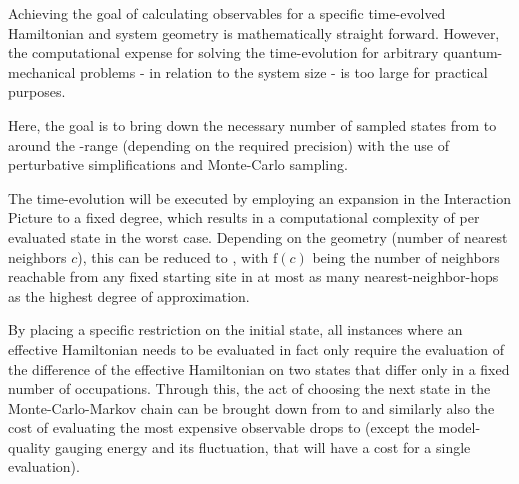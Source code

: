 Achieving the goal of calculating observables for a specific time-evolved Hamiltonian and system geometry is mathematically straight forward.
However, the computational expense for solving the time-evolution for arbitrary quantum-mechanical problems - in relation to the system size - is too large for practical purposes.

Here, the goal is to bring down the necessary number of sampled states from  to around the -range (depending on the required precision) with the use of perturbative simplifications and Monte-Carlo sampling. 

The time-evolution will be executed by employing an expansion in the Interaction Picture to a fixed degree, which results in a computational complexity of  per evaluated state in the worst case.
Depending on the geometry (number of nearest neighbors $c$), this can be reduced to , with $\mathrm{f}(c)$ being the number of neighbors reachable from any fixed starting site in at most as many nearest-neighbor-hops as the highest degree of approximation.

By placing a specific restriction on the initial state, all instances where an effective Hamiltonian needs to be evaluated in fact only require the evaluation of the difference of the effective Hamiltonian on two states that differ only in a fixed number of occupations.
Through this, the act of choosing the next state in the Monte-Carlo-Markov chain can be brought down from  to  and similarly also the cost of evaluating the most expensive observable drops to  (except the model-quality gauging energy and its fluctuation, that will have a cost  for a single evaluation).
